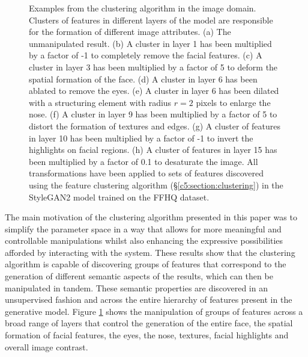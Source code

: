 \begin{figure}[!htbp]
        \hfill
        \hfill
       \caption[A comparison of different transforms being applied to different clusters in various layers of StyleGAN2]{Examples from the clustering algorithm in the image domain. Clusters of features in different layers of the model are responsible for the formation of different image attributes. (a) The unmanipulated result. (b) A cluster in layer 1 has been multiplied by a factor of -1 to completely remove the facial features. (c) A cluster in layer 3 has been multiplied by a factor of 5 to deform the spatial formation of the face. (d) A cluster in layer 6 has been ablated to remove the eyes. (e) A cluster in layer 6 has been dilated with a structuring element with radius $r=2$ pixels to enlarge the nose. (f) A cluster in layer 9 has been multiplied by a factor of 5 to distort the formation of textures and edges. (g) A cluster of features in layer 10 has been multiplied by a factor of -1 to invert the highlights on facial regions. (h) A cluster of features in layer 15 has been multiplied by a factor of 0.1 to desaturate the image. All transformations have been applied to sets of features discovered using the feature clustering algorithm (\S\ref{c5:section:clustering}) in the StyleGAN2 model trained on the FFHQ dataset.}
       \label{fig:c5:cluster_layer_comp_image}
    \end{figure}

The main motivation of the clustering algorithm presented in this paper was to simplify the parameter space in a way that allows for more meaningful and controllable manipulations whilst also enhancing the expressive possibilities afforded by interacting with the system. 
These results show that the clustering algorithm is capable of discovering groups of features that correspond to the generation of different semantic aspects of the results, which can then be manipulated in tandem. 
These semantic properties are discovered in an unsupervised fashion and across the entire hierarchy of features present in the generative model.
Figure \ref{fig:c5:cluster_layer_comp_image} shows the manipulation of groups of features across a broad range of layers that control the generation of the entire face, the spatial formation of facial features, the eyes, the nose, textures, facial highlights and overall image contrast.


